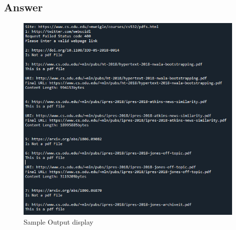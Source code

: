 \documentclass[12pt]{article}
\begin{document}
\subsection*{Answer}


\begin{figure}[H]
    \centering
    \includegraphics[trim=0 0 0 0, clip, width=\textwidth] {Q3output.png}
    \caption{Sample Output display }
    \label{fig:Q3output}
\end{figure}
\end{document}
